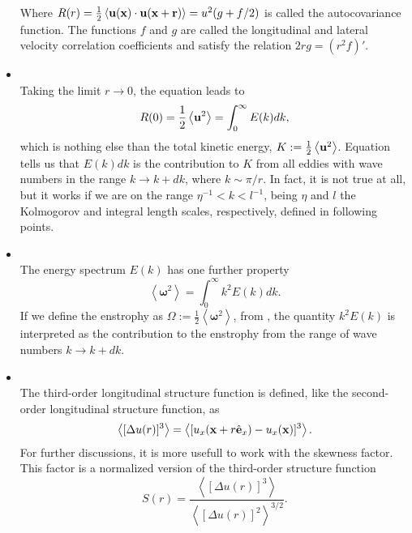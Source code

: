 \begin{itemize}
Where $R(r)=\frac{1}{2}\left\langle{\bf u}({\bf x})\cdot{\bf u}({\bf x}+{\bf r})\right\rangle=u^2(g+f/2)$ is called the autocovariance function. The functions $f$ and $g$ are called the longitudinal and lateral velocity correlation coefficients and satisfy the relation $2rg=(r^2f)'$.
\item{}\\ Taking the limit $r\rightarrow 0$, the equation  leads to
\begin{equation}
\label{eq-total_kinetic_energy}
R(0)=\frac{1}{2}\left\langle{\bf u}^2\right\rangle=\int_0^\infty E(k)dk,
\end{equation}
which is nothing else than the total kinetic energy, $K:=\frac{1}{2}\left\langle{\bf u}^2\right\rangle$. Equation  tells us that $E(k)dk$ is the contribution to $K$ from all eddies with wave numbers in the range $k\rightarrow k+dk$, where $k\sim\pi/r$. In fact, it is not true at all, but it works if we are on the range $\eta^{-1}<k<l^{-1}$, being $\eta$ and $l$ the Kolmogorov and integral length scales, respectively, defined in following points.
\item{}\\ The energy spectrum $E(k)$ has one further property
\begin{equation}
\label{eq-enstrophy}
\left\langle\boldsymbol{\omega}^2\right\rangle=\int_0^\infty k^2E(k)dk.
\end{equation}
If we define the enstrophy as $\Omega:=\frac{1}{2}\left\langle\boldsymbol{\omega}^2\right\rangle$, from , the quantity $k^2E(k)$ is interpreted as the contribution to the enstrophy from the range of wave numbers $k\rightarrow k+dk$.
\item{}\\ The third-order longitudinal structure function is defined, like the second-order longitudinal structure function, as
\begin{equation*}
\label{eq-third_order_structure}
\left\langle[\Delta u(r)]^3\right\rangle=\left\langle[u_x({\bf x}+r\hat{{\bf e}}_x)-u_x({\bf x})]^3\right\rangle.
\end{equation*}
For further discussions, it is more usefull to work with the skewness factor. This factor is a normalized version of the third-order structure function
\begin{equation}
\label{eq-skewness_factor}
S(r)=\frac{\left\langle[\Delta u(r)]^3\right\rangle}{\left\langle[\Delta u(r)]^2\right\rangle^{3/2}}.
\end{equation}

\end{itemize}
